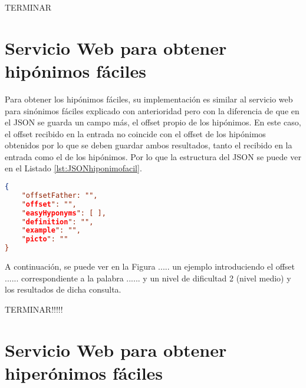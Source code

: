 TERMINAR


\section{Servicio Web  para obtener hipónimos fáciles}
Para obtener los hipónimos fáciles, su implementación es similar al servicio web para sinónimos fáciles explicado con anterioridad pero con la diferencia de que en el JSON se guarda un campo más, el offset propio de los hipónimos.
En este caso, el offset recibido en la entrada no coincide con el offset de los hipónimos obtenidos por lo que se deben guardar ambos resultados, tanto el recibido en la entrada como el de los hipónimos.
Por lo que la estructura del JSON se puede ver en el Listado \ref{lst:JSONhiponimofacil}.






\begin{lstlisting}[language=json, caption= Estructura JSON para hipónimos fáciles, label={lst:JSONhiponimofacil}, frame=single]
{ 
	"offsetFather: "",
	"offset": "", 
	"easyHyponyms": [ ], 
	"definition": "", 
	"example": "", 
	"picto": ""
}
\end{lstlisting}


A continuación, se puede ver en la Figura ..... un ejemplo introduciendo el offset ...... correspondiente a la palabra ......  y un nivel de dificultad 2 (nivel medio) y los resultados de dicha consulta.


TERMINAR!!!!!
\section{Servicio Web  para obtener hiperónimos fáciles}

